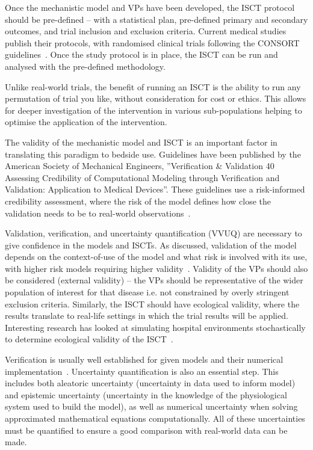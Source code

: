 \documentclass[12pt,a4paper]{journal}
\begin{document}
Once the mechanistic model and VPs have been developed, the ISCT protocol should be pre-defined – with a statistical plan, pre-defined primary and secondary outcomes, and trial inclusion and exclusion criteria. Current medical studies publish their protocols, with randomised clinical trials following the CONSORT guidelines~\cite{Schulz2010}. Once the study protocol is in place, the ISCT can be run and analysed with the pre-defined methodology.

Unlike real-world trials, the benefit of running an ISCT is the ability to run any permutation of trial you like, without consideration for cost or ethics. This allows for deeper investigation of the intervention in various sub-populations helping to optimise the application of the intervention.

The validity of the mechanistic model and ISCT is an important factor in translating this paradigm to bedside use. Guidelines have been published by the American Society of Mechanical Engineers, ''Verification \& Validation 40 Assessing Credibility of Computational Modeling through Verification and Validation: Application to Medical Devices''. These guidelines use a risk-informed credibility assessment, where the risk of the model defines how close the validation needs to be to real-world observations~\cite{ASME2018}.

Validation, verification, and uncertainty quantification (VVUQ) are necessary to give confidence in the models and ISCTs. As discussed, validation of the model depends on the context-of-use of the model and what risk is involved with its use, with higher risk models requiring higher validity~\cite{Pappalardo2019}. Validity of the VPs should also be considered (external validity) – the VPs should be representative of the wider population of interest for that disease i.e. not constrained by overly stringent exclusion criteria. Similarly, the ISCT should have ecological validity, where the results translate to real-life settings in which the trial results will be applied. Interesting research has looked at simulating hospital environments stochastically to determine ecological validity of the ISCT~\cite{Fuertinger2018}.

Verification is usually well established for given models and their numerical implementation~\cite{Curreli2021, Pappalardo2019}. Uncertainty quantification is also an essential step. This includes both aleatoric uncertainty (uncertainty in data used to inform model) and epistemic uncertainty (uncertainty in the knowledge of the physiological system used to build the model), as well as numerical uncertainty when solving approximated mathematical equations computationally. All of these uncertainties must be quantified to ensure a good comparison with real-world data can be made.
\end{document}
